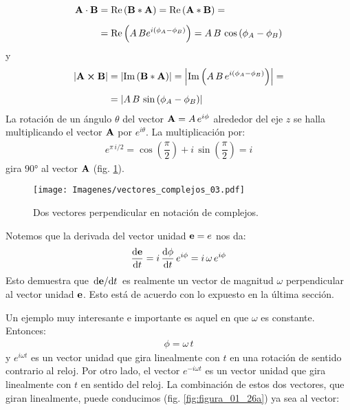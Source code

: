 \begin{align}
\begin{aligned}[b]
    \vb{A} \cdot \vb{B} &= \Re \left( \vb{B} * \vb{A} \right) = \Re \left( \vb{A} * \vb{B} \right) = \\[0.5em]
    &= \Re \left( A \, B e^{i ( \phi_{A} - \phi_{B})} \right) = A \, B \, \cos \left( \phi_{A} - \phi_{B} \right)
\end{aligned}
\label{eq:ecuacion_01_88}
\end{align}
y
\begin{align}
\begin{aligned}[b]
    \abs{ \vb{A} \cp \vb{B}} &= \abs{ \Im \left( \vb{B} * \vb{A} \right) } = \abs{ \Im \left( A \, B \, e^{i (\phi_{A} - \phi_{B})} \right)} = \\[0.5em]
    &= \abs{ A \, B \, \sin \left( \phi_{A} - \phi_{B} \right)}
\end{aligned}
\label{eq:ecuacion_01_89}
\end{align}
La rotación de un ángulo $\theta$ del vector $\vb{A} = A \, e^{i \phi}$ alrededor del eje $z$ se halla multiplicando el vector $\vb{A}$ por $e^{i \theta}$. La multiplicación por:
\begin{align*}
    e^{\pi \, i /2} = \cos \left( \dfrac{\pi}{2} \right) +  i \, \sin \left( \dfrac{\pi}{2} \right) = i
\end{align*}
gira $\ang{90}$ al vector $\vb{A}$ (fig. \ref{fig:figura_01_25}). 
\begin{figure}[H]
    \centering
    \texttt{[image: Imagenes/vectores\_complejos\_03.pdf]}
    \caption{Dos vectores perpendicular en notación de complejos.}
    \label{fig:figura_01_25}
\end{figure}
Notemos que la derivada del vector unidad $\vb{e} = e$ nos da:
\begin{align*}
    \dv{\vb{e}}{t} = i \, \dv{\phi}{t} \, e^{i \phi} = i \, \omega \, e^{i \phi}
\end{align*}
Esto demuestra que $\dv*{\vb{e}}{t}$ es realmente un vector de magnitud $\omega$ perpendicular al vector unidad $\vb{e}$. Esto está de acuerdo con lo expuesto en la última sección.
\par
Un ejemplo muy interesante e importante es aquel en que $\omega$ es constante. Entonces:
\begin{align}
    \phi = \omega \, t
    \label{eq:ecuacion_01_90}
\end{align}
y $e^{i \omega t}$ es un vector unidad que gira linealmente con $t$ en una rotación de sentido contrario al reloj. Por otro lado, el vector $e^{-i \omega t}$ es un vector unidad que gira linealmente con $t$ en sentido del reloj. La combinación de estos dos vectores, que giran linealmente, puede conducimos (fig. \ref{fig:figura_01_26a}) ya sea al vector:
